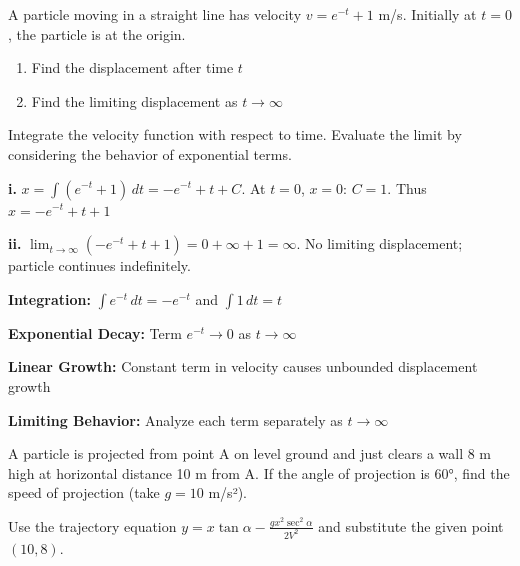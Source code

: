 \begin{problem}[Integration]
A particle moving in a straight line has velocity $v = e^{-t} + 1$ m/s. Initially at $t = 0$, the particle is at the origin.
\begin{enumerate}[label=\textbf{\roman*.}]
    \item Find the displacement after time $t$
    \item Find the limiting displacement as $t \to \infty$
\end{enumerate}
\end{problem}

\begin{hint}
Integrate the velocity function with respect to time. Evaluate the limit by considering the behavior of exponential terms.
\end{hint}

\begin{solution}
\textbf{i.} $x = \int (e^{-t} + 1)\,dt = -e^{-t} + t + C$. At $t=0$, $x=0$: $C = 1$. Thus $x = -e^{-t} + t + 1$

\textbf{ii.} $\lim_{t \to \infty} (-e^{-t} + t + 1) = 0 + \infty + 1 = \infty$. No limiting displacement; particle continues indefinitely.
\end{solution}

\begin{takeaways}
\item \textbf{Integration:} $\int e^{-t}\,dt = -e^{-t}$ and $\int 1\,dt = t$
\item \textbf{Exponential Decay:} Term $e^{-t} \to 0$ as $t \to \infty$
\item \textbf{Linear Growth:} Constant term in velocity causes unbounded displacement growth
\item \textbf{Limiting Behavior:} Analyze each term separately as $t \to \infty$
\end{takeaways}

\begin{problem}
A particle is projected from point A on level ground and just clears a wall 8 m high at horizontal distance 10 m from A. If the angle of projection is $60°$, find the speed of projection (take $g = 10$ m/s²).
\end{problem}

\begin{hint}
Use the trajectory equation $y = x\tan\alpha - \frac{gx^2\sec^2\alpha}{2V^2}$ and substitute the given point $(10, 8)$.
\end{hint}

